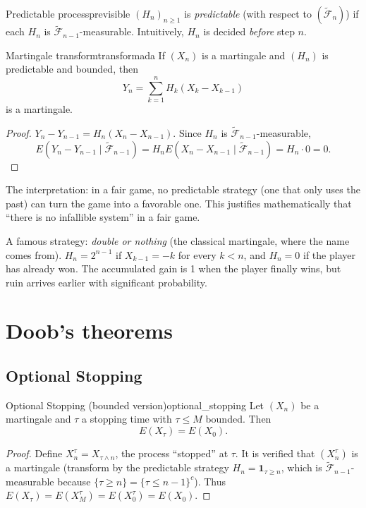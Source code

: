 \documentclass[11pt, a4paper]{article}
\begin{document}
\begin{definicion}{Predictable process}{previsible}
$(H_n)_{n \ge 1}$ is \emph{predictable} (with respect to $(\widetilde{\mathcal{F}}_n)$) if each $H_n$ is
$\widetilde{\mathcal{F}}_{n-1}$-measurable. Intuitively, $H_n$ is decided \emph{before} step $n$.
\end{definicion}

\begin{proposicion}{Martingale transform}{transformada}
If $(X_n)$ is a martingale and $(H_n)$ is predictable and bounded, then
$$ Y_n = \sum_{k=1}^n H_k (X_k - X_{k-1}) $$
is a martingale.
\end{proposicion}

\begin{proof}
$Y_n - Y_{n-1} = H_n (X_n - X_{n-1})$. Since $H_n$ is $\widetilde{\mathcal{F}}_{n-1}$-measurable,
$$ E(Y_n - Y_{n-1} \mid \widetilde{\mathcal{F}}_{n-1}) = H_n E(X_n - X_{n-1} \mid
\widetilde{\mathcal{F}}_{n-1}) = H_n \cdot 0 = 0. $$
\end{proof}

\obs The interpretation: in a fair game, no predictable strategy (one that only uses the
past) can turn the game into a favorable one. This justifies mathematically that ``there is no
infallible system'' in a fair game.

\obs A famous strategy: \emph{double or nothing} (the classical martingale, where the name comes from).
$H_n = 2^{n-1}$ if $X_{k-1} = -k$ for every $k < n$, and $H_n = 0$ if the player has already won. The accumulated
gain is 1 when the player finally wins, but ruin arrives earlier with significant probability.

\newpage

\section{Doob's theorems}

\subsection{Optional Stopping}

\begin{teorema}{Optional Stopping (bounded version)}{optional_stopping}
Let $(X_n)$ be a martingale and $\tau$ a stopping time with $\tau \le M$ bounded. Then
$$ E(X_\tau) = E(X_0). $$
\end{teorema}

\begin{proof}
Define $X_n^\tau = X_{\tau \wedge n}$, the process ``stopped'' at $\tau$. It is verified that
$(X_n^\tau)$ is a martingale (transform by the predictable strategy
$H_n = \mathbf{1}_{\tau \ge n}$,
which is $\widetilde{\mathcal{F}}_{n-1}$-measurable because $\{\tau \ge n\} = \{\tau \le n-1\}^c$).
Thus $E(X_\tau) = E(X_M^\tau) = E(X_0^\tau) = E(X_0)$.
\end{proof}
\end{document}

